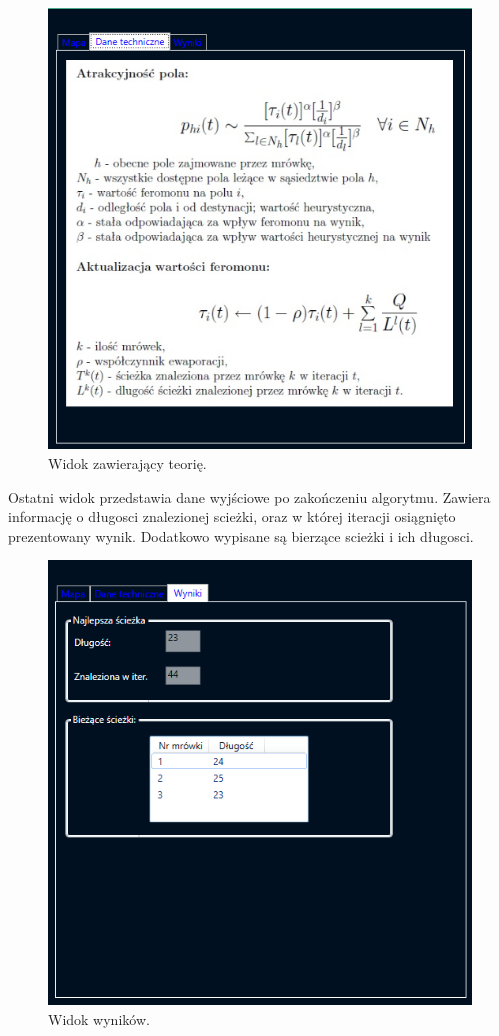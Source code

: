 \documentclass[printmode, openany, oneside, eng]{mgr}
\begin{document}
\begin{figure}[h]
\centering
\includegraphics[scale=1]{img/View2.png}
\caption{Widok zawierający teorię.}
\label{fig:View2}
\end{figure}
\newpage
Ostatni widok przedstawia dane wyjściowe po zakończeniu algorytmu. Zawiera informację o długosci znalezionej scieżki, oraz w której iteracji osiągnięto prezentowany wynik. Dodatkowo wypisane są bierzące scieżki i ich długosci.

\begin{figure}[h]
\centering
\includegraphics[scale=1]{img/View3.png}
\caption{Widok wyników.}
\label{fig:View3}
\end{figure}
\end{document}
